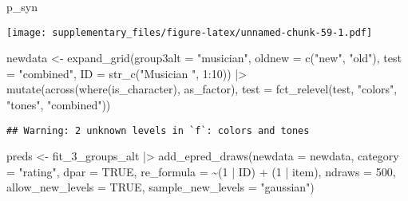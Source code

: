 \documentclass[
  man,floatsintext]{apa7}
\newenvironment{Shaded}{\begin{snugshade}}{\end{snugshade}}
\newcommand{\AttributeTok}[1]{\textcolor[rgb]{0.77,0.63,0.00}{#1}}
\newcommand{\ConstantTok}[1]{\textcolor[rgb]{0.00,0.00,0.00}{#1}}
\newcommand{\DecValTok}[1]{\textcolor[rgb]{0.00,0.00,0.81}{#1}}
\newcommand{\FunctionTok}[1]{\textcolor[rgb]{0.00,0.00,0.00}{#1}}
\newcommand{\NormalTok}[1]{#1}
\newcommand{\OtherTok}[1]{\textcolor[rgb]{0.56,0.35,0.01}{#1}}
\newcommand{\SpecialCharTok}[1]{\textcolor[rgb]{0.00,0.00,0.00}{#1}}
\newcommand{\StringTok}[1]{\textcolor[rgb]{0.31,0.60,0.02}{#1}}
\begin{document}
\begin{Shaded}
\begin{Highlighting}[]
\NormalTok{p\_syn}
\end{Highlighting}
\end{Shaded}

\texttt{[image: supplementary\_files/figure-latex/unnamed-chunk-59-1.pdf]}

\begin{Shaded}
\begin{Highlighting}[]
\NormalTok{newdata }\OtherTok{\textless{}{-}} \FunctionTok{expand\_grid}\NormalTok{(}\AttributeTok{group3alt =} \StringTok{"musician"}\NormalTok{,}
                       \AttributeTok{oldnew =} \FunctionTok{c}\NormalTok{(}\StringTok{"new"}\NormalTok{, }\StringTok{"old"}\NormalTok{),}
                       \AttributeTok{test =} \StringTok{"combined"}\NormalTok{, }
                       \AttributeTok{ID =} \FunctionTok{str\_c}\NormalTok{(}\StringTok{"Musician "}\NormalTok{, }\DecValTok{1}\SpecialCharTok{:}\DecValTok{10}\NormalTok{)) }\SpecialCharTok{|\textgreater{}} 
  \FunctionTok{mutate}\NormalTok{(}\FunctionTok{across}\NormalTok{(}\FunctionTok{where}\NormalTok{(is\_character), as\_factor),}
         \AttributeTok{test =} \FunctionTok{fct\_relevel}\NormalTok{(test,}
                            \StringTok{"colors"}\NormalTok{, }\StringTok{"tones"}\NormalTok{, }\StringTok{"combined"}\NormalTok{))}
\end{Highlighting}
\end{Shaded}

\begin{verbatim}
## Warning: 2 unknown levels in `f`: colors and tones
\end{verbatim}

\begin{Shaded}
\begin{Highlighting}[]
\NormalTok{preds }\OtherTok{\textless{}{-}}\NormalTok{ fit\_3\_groups\_alt }\SpecialCharTok{|\textgreater{}} 
  \FunctionTok{add\_epred\_draws}\NormalTok{(}\AttributeTok{newdata =}\NormalTok{ newdata,}
                  \AttributeTok{category =} \StringTok{"rating"}\NormalTok{,}
                  \AttributeTok{dpar =} \ConstantTok{TRUE}\NormalTok{,}
                  \AttributeTok{re\_formula =} \SpecialCharTok{\textasciitilde{}}\NormalTok{(}\DecValTok{1} \SpecialCharTok{|}\NormalTok{ ID) }\SpecialCharTok{+}\NormalTok{ (}\DecValTok{1} \SpecialCharTok{|}\NormalTok{ item),}
                  \AttributeTok{ndraws =} \DecValTok{500}\NormalTok{,}
                  \AttributeTok{allow\_new\_levels =} \ConstantTok{TRUE}\NormalTok{,}
                  \AttributeTok{sample\_new\_levels =} \StringTok{"gaussian"}\NormalTok{)}
\end{Highlighting}
\end{Shaded}
\end{document}
